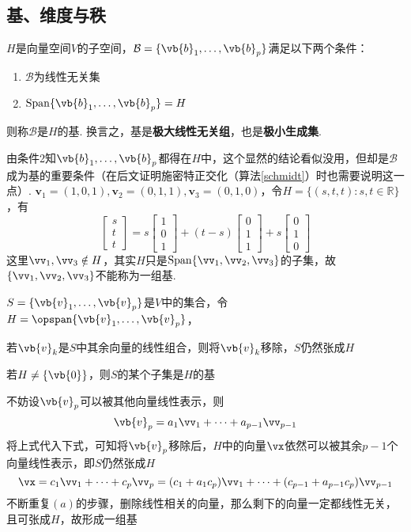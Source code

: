 \subsection{基、维度与秩}
\begin{definition}[基]
$H$是向量空间$V$的子空间，$\mathcal{B}=\{\vb{b}_1,\dots,\vb{b}_p\}$满足以下两个条件：
\begin{enumerate}
	\item $\mathcal{B}$为线性无关集
	\item $\mathrm{Span}\{\vb{b}_1,\dots,\vb{b}_p\}=H$
\end{enumerate}
则称$\mathcal{B}$是$H$的基. 换言之，基是\textbf{极大线性无关组}，也是\textbf{极小生成集}.
\end{definition}
由条件2知$\vb{b}_1,\dots,\vb{b}_p$都得在$H$中，这个显然的结论看似没用，但却是$\mathcal{B}$成为基的重要条件（在后文证明施密特正交化（算法\ref{schmidt}）时也需要说明这一点）.
$\mathbf{v}_1=(1,0,1),\mathbf{v}_2=(0,1,1),\mathbf{v}_3=(0,1,0)$，令$H=\{(s,t,t):s,t\in \mathbb{R}\}$，有
\[
\begin{bmatrix}s \\t \\t\end{bmatrix}=s\begin{bmatrix}1 \\0 \\1\end{bmatrix}+(t-s)\begin{bmatrix}0 \\1 \\1 \end{bmatrix}+s\begin{bmatrix}0 \\1 \\0 \end{bmatrix}\]
这里$\vv_1,\vv_3\notin H$，其实$H$只是$\mathrm{Span}\{\vv_1,\vv_2,\vv_3\}$的子集，故$\{\vv_1,\vv_2,\vv_3\}$不能称为一组基.
\begin{theorem}
$S=\{\vb{v}_1,\dots,\vb{v}_p\}$是$V$中的集合，令$H=\opspan\{\vb{v}_1,\dots,\vb{v}_p\}$，
\begin{partlist}
	\item 若$\vb{v}_k$是$S$中其余向量的线性组合，则将$\vb{v}_k$移除，$S$仍然张成$H$
	\item 若$H\ne\{\vb{0}\}$，则$S$的某个子集是$H$的基
\end{partlist}
\end{theorem}
\begin{analysis}不妨设$\vb{v}_p$可以被其他向量线性表示，则
\[\vb{v}_p=a_1\vv_1+\cdots+a_{p-1}\vv_{p-1}\]
将上式代入下式，可知将$\vb{v}_p$移除后，$H$中的向量$\vx$依然可以被其余$p-1$个向量线性表示，即$S$仍然张成$H$
\[\vx=c_1\vv_1+\cdots+c_p\vv_p=(c_1+a_1c_p)\vv_1+\cdots+(c_{p-1}+a_{p-1}c_p)\vv_{p-1}\]
不断重复$(a)$的步骤，删除线性相关的向量，那么剩下的向量一定都线性无关，且可张成$H$，故形成一组基
\end{analysis}
